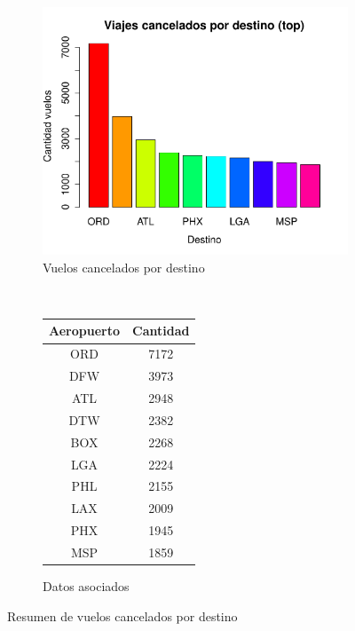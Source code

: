 \documentclass[12pt]{article}
\numberwithin{equation}{section}
\numberwithin{table}{section}
\numberwithin{figure}{section}
\begin{document}
\begin{figure}
        \centering
        ~
        \begin{subfigure}[b]{0.6\textwidth}
                \includegraphics[width=1\columnwidth]{imagenes/cancelados/viajes-cancelados-por-destino-top}
                \caption{Vuelos cancelados por destino}
        \end{subfigure}
        ~
        \begin{subfigure}[b]{0.3\textwidth}
                \begin{tabular}{@{}cc@{}}
                  \toprule
                  \textbf{Aeropuerto} & \textbf{Cantidad} \\ \midrule
                  ORD                 & 7172              \\
                  DFW                 & 3973              \\
                  ATL                 & 2948              \\
                  DTW                 & 2382              \\
                  BOX                 & 2268              \\
                  LGA                 & 2224              \\
                  PHL                 & 2155              \\
                  LAX                 & 2009              \\
                  PHX                 & 1945              \\
                  MSP                 & 1859              \\ \bottomrule
                  \end{tabular}
                \caption{Datos asociados}
        \end{subfigure}
        \caption{Resumen de vuelos cancelados por destino}
        \label{fig:cancelados-por-destino}
\end{figure}
\end{document}
